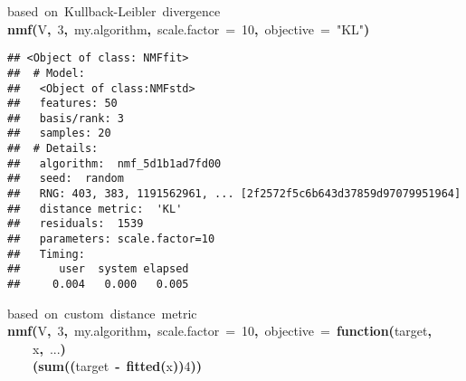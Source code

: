 \documentclass[a4paper]{article}\usepackage{graphicx, color}
\makeatletter
\newcommand{\hlnumber}[1]{\textcolor[rgb]{0,0,0}{#1}}%
\newcommand{\hlfunctioncall}[1]{\textcolor[rgb]{0.501960784313725,0,0.329411764705882}{\textbf{#1}}}%
\newcommand{\hlstring}[1]{\textcolor[rgb]{0.6,0.6,1}{#1}}%
\newcommand{\hlkeyword}[1]{\textcolor[rgb]{0,0,0}{\textbf{#1}}}%
\newcommand{\hlargument}[1]{\textcolor[rgb]{0.690196078431373,0.250980392156863,0.0196078431372549}{#1}}%
\newcommand{\hlcomment}[1]{\textcolor[rgb]{0.180392156862745,0.6,0.341176470588235}{#1}}%
\newcommand{\hlformalargs}[1]{\textcolor[rgb]{0.690196078431373,0.250980392156863,0.0196078431372549}{#1}}%
\newcommand{\hlsymbol}[1]{\textcolor[rgb]{0,0,0}{#1}}%
\newcommand{\hlstd}[1]{\textcolor[rgb]{0,0,0}{#1}}%
\newenvironment{kframe}{%
 \def\FrameCommand##1{\hskip\@totalleftmargin \hskip-\fboxsep
 \colorbox{shadecolor}{##1}\hskip-\fboxsep
     \hskip-\linewidth \hskip-\@totalleftmargin \hskip\columnwidth}%
 \MakeFramed {\advance\hsize-\width
   \@totalleftmargin\z@ \linewidth\hsize
   \@setminipage}}%
 {\par\unskip\endMakeFramed}
\newenvironment{knitrout}{}{} %
\makeatother
\begin{document}
\begin{knitrout}
\color{fgcolor}\begin{kframe}
\begin{flushleft}
\ttfamily\noindent
\hlcomment{\usebox{\hlnormalsizeboxhash}{\ }based{\ }on{\ }Kullback-Leibler{\ }divergence}\hspace*{\fill}\\
\hlstd{}\hlfunctioncall{nmf}\hlkeyword{(}\hlsymbol{V}\hlkeyword{,}{\ }\hlnumber{3}\hlkeyword{,}{\ }\hlsymbol{my.algorithm}\hlkeyword{,}{\ }\hlargument{scale.factor}{\ }\hlargument{=}{\ }\hlnumber{10}\hlkeyword{,}{\ }\hlargument{objective}{\ }\hlargument{=}{\ }\hlstring{"{}KL"{}}\hlkeyword{)}\mbox{}
\normalfont
\end{flushleft}
\begin{verbatim}
## <Object of class: NMFfit>
##  # Model:
##   <Object of class:NMFstd>
##   features: 50 
##   basis/rank: 3 
##   samples: 20 
##  # Details:
##   algorithm:  nmf_5d1b1ad7fd00 
##   seed:  random 
##   RNG: 403, 383, 1191562961, ... [2f2572f5c6b643d37859d97079951964]
##   distance metric:  'KL' 
##   residuals:  1539 
##   parameters: scale.factor=10 
##   Timing:
##      user  system elapsed 
##     0.004   0.000   0.005 
\end{verbatim}
\begin{flushleft}
\ttfamily\noindent
\hlcomment{\usebox{\hlnormalsizeboxhash}{\ }based{\ }on{\ }custom{\ }distance{\ }metric}\hspace*{\fill}\\
\hlstd{}\hlfunctioncall{nmf}\hlkeyword{(}\hlsymbol{V}\hlkeyword{,}{\ }\hlnumber{3}\hlkeyword{,}{\ }\hlsymbol{my.algorithm}\hlkeyword{,}{\ }\hlargument{scale.factor}{\ }\hlargument{=}{\ }\hlnumber{10}\hlkeyword{,}{\ }\hlargument{objective}{\ }\hlargument{=}{\ }\hlkeyword{function}\hlkeyword{(}\hlformalargs{target}\hlkeyword{,}\hspace*{\fill}\\
\hlstd{}{\ }{\ }{\ }{\ }\hlformalargs{x}\hlkeyword{,}{\ }\hlformalargs{...}\hlkeyword{)}{\ }\hlkeyword{\usebox{\hlnormalsizeboxopenbrace}}\hspace*{\fill}\\
\hlstd{}{\ }{\ }{\ }{\ }\hlkeyword{(}\hlfunctioncall{sum}\hlkeyword{(}\hlkeyword{(}\hlsymbol{target}{\ }\hlkeyword{-}{\ }\hlfunctioncall{fitted}\hlkeyword{(}\hlsymbol{x}\hlkeyword{)}\hlkeyword{)}\hlkeyword{\usebox{\hlnormalsizeboxhat}}\hlnumber{4}\hlkeyword{)}\hlkeyword{)}\hlkeyword{\usebox{\hlnormalsizeboxhat}}\hlkeyword{\usebox{\hlnormalsizeboxopenbrace}}\hspace*{\fill}\\

\end{flushleft}
\end{kframe}
\end{knitrout}
\end{document}
